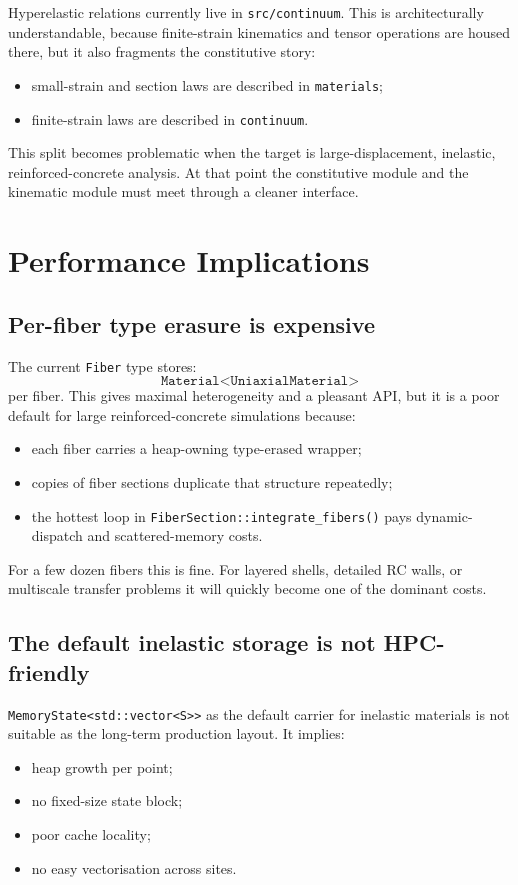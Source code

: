 Hyperelastic relations currently live in \texttt{src/continuum}.  This is
architecturally understandable, because finite-strain kinematics and tensor
operations are housed there, but it also fragments the constitutive story:
\begin{itemize}
  \item small-strain and section laws are described in \texttt{materials};
  \item finite-strain laws are described in \texttt{continuum}.
\end{itemize}

This split becomes problematic when the target is large-displacement,
inelastic, reinforced-concrete analysis.  At that point the constitutive
module and the kinematic module must meet through a cleaner interface.

\section{Performance Implications}

\subsection{Per-fiber type erasure is expensive}

The current \texttt{Fiber} type stores:
\[
\texttt{Material<UniaxialMaterial>}
\]
per fiber.  This gives maximal heterogeneity and a pleasant API, but it is a
poor default for large reinforced-concrete simulations because:
\begin{itemize}
  \item each fiber carries a heap-owning type-erased wrapper;
  \item copies of fiber sections duplicate that structure repeatedly;
  \item the hottest loop in \texttt{FiberSection::integrate\_fibers()} pays
        dynamic-dispatch and scattered-memory costs.
\end{itemize}

For a few dozen fibers this is fine.  For layered shells, detailed RC walls,
or multiscale transfer problems it will quickly become one of the dominant
costs.

\subsection{The default inelastic storage is not HPC-friendly}

\texttt{MemoryState<std::vector<S>>} as the default carrier for inelastic
materials is not suitable as the long-term production layout.  It implies:
\begin{itemize}
  \item heap growth per point;
  \item no fixed-size state block;
  \item poor cache locality;
  \item no easy vectorisation across sites.
\end{itemize}

